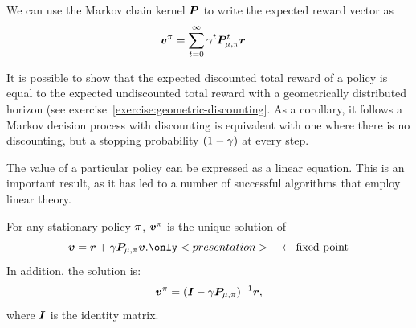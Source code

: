   \begin{remark}
    We can use the Markov chain kernel $\trans$ to write the expected reward vector as
    \begin{align}
      \val^\pol
      &=
      \sum_{t=0}^\infty \disc^{t} \trans_{\mdp,\pol}^{t} \vreward
      \label{eq:kernel-value}
    \end{align}
    \label{rem:kernel-value}
  \end{remark}

  It is possible to show that the expected discounted total reward of a policy is equal to the expected undiscounted total reward with a geometrically distributed horizon (see exercise~\ref{exercise:geometric-discounting}. As a corollary, it follows a Markov decision process with discounting is equivalent with one where there is no discounting, but a stopping probability $(1 - \gamma)$ at every step.

The value of a particular policy can be expressed as a linear equation. This is an important result, as it has led to a number of successful algorithms that employ linear theory.
  \begin{theorem}
    For any stationary policy $\pi$, $\val^\pol$ is the unique solution of
    \begin{equation}
      \label{eq:bellman-equation}
      \val = \vreward + \disc \trans_{\mdp,\pol} \val. \only<presentation>{\quad \leftarrow \textrm{fixed point}}
    \end{equation}
    In addition, the solution is:
    \begin{equation}
      \label{eq:bellman-solution}
      \val^\pol = (\ident - \disc \trans_{\mdp,\pol})^{-1} \vreward,
    \end{equation}
    \label{the:inverse-value}
    where $\ident$ is the identity matrix.
  \end{theorem}

